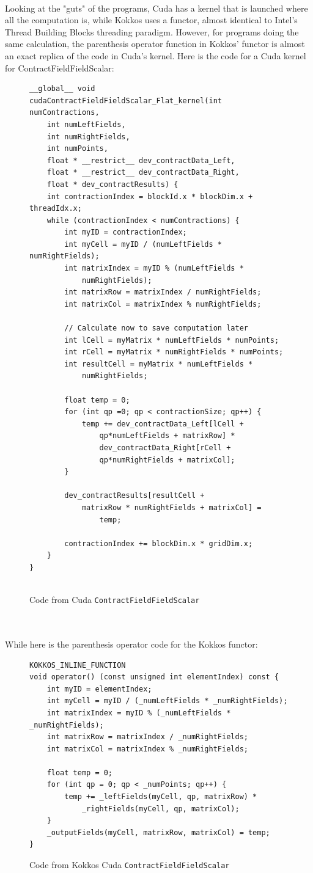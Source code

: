 \\
Looking at the "guts" of the programs, Cuda has a kernel that is launched where all the computation is, while Kokkos uses a functor, almost identical to Intel's Thread Building Blocks threading paradigm. However, for programs doing the same calculation, the parenthesis operator function in Kokkos' functor is almost an exact replica of the code in Cuda's kernel. Here is the code for a Cuda kernel for ContractFieldFieldScalar: \\
\begin{figure}[htb]
	\begin{lstlisting}
__global__ void
cudaContractFieldFieldScalar_Flat_kernel(int numContractions,
	int numLeftFields,
	int numRightFields,
	int numPoints,
	float * __restrict__ dev_contractData_Left,
	float * __restrict__ dev_contractData_Right,
	float * dev_contractResults) {
	int contractionIndex = blockId.x * blockDim.x + threadIdx.x;
	while (contractionIndex < numContractions) {
		int myID = contractionIndex;
		int myCell = myID / (numLeftFields * numRightFields);
		int matrixIndex = myID % (numLeftFields * 
			numRightFields);
		int matrixRow = matrixIndex / numRightFields;
		int matrixCol = matrixIndex % numRightFields;
		
		// Calculate now to save computation later
		int lCell = myMatrix * numLeftFields * numPoints;
		int rCell = myMatrix * numRightFields * numPoints;
		int resultCell = myMatrix * numLeftFields * 
			numRightFields;
		
		float temp = 0;
		for (int qp =0; qp < contractionSize; qp++) {
			temp += dev_contractData_Left[lCell + 
				qp*numLeftFields + matrixRow] *
				dev_contractData_Right[rCell + 
				qp*numRightFields + matrixCol];
		}

		dev_contractResults[resultCell + 
			matrixRow * numRightFields + matrixCol] = 
				temp;
		
		contractionIndex += blockDim.x * gridDim.x;
	}
}
	
	\end{lstlisting}
\caption{Code from Cuda \texttt{ContractFieldFieldScalar}
\label{lst:ContractFieldFieldScalar Cuda kernel}}
\end{figure} \\
\\
While here is the parenthesis operator code for the Kokkos functor: \\
\begin{figure}[htb]
	\begin{lstlisting}
KOKKOS_INLINE_FUNCTION
void operator() (const unsigned int elementIndex) const {
	int myID = elementIndex;
	int myCell = myID / (_numLeftFields * _numRightFields);
	int matrixIndex = myID % (_numLeftFields * _numRightFields);
	int matrixRow = matrixIndex / _numRightFields;
	int matrixCol = matrixIndex % _numRightFields;

	float temp = 0;
	for (int qp = 0; qp < _numPoints; qp++) {
		temp += _leftFields(myCell, qp, matrixRow) *
			_rightFields(myCell, qp, matrixCol);
	}
	_outputFields(myCell, matrixRow, matrixCol) = temp;
}
	\end{lstlisting}
\caption{Code from Kokkos Cuda \texttt{ContractFieldFieldScalar}
\label{lst:ContractFieldFieldScalar Kokkos Cuda functor}}
\end{figure}
